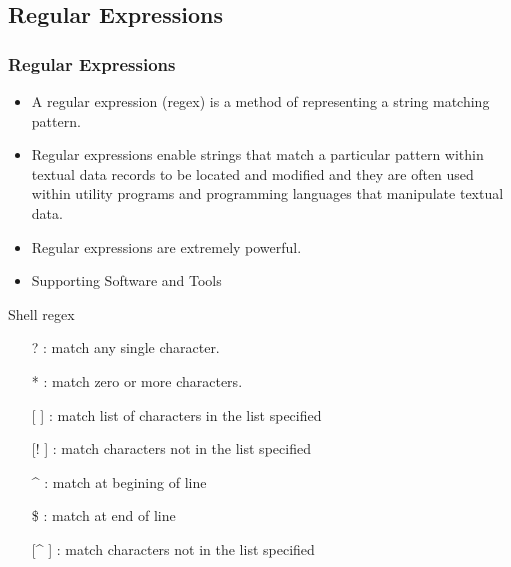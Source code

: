 \documentclass[slidestop,mathserif,compress,xcolor=svgnames]{beamer}
\newenvironment{eblock}[0]
{
\begin{beamerboxesrounded}[upper=uppercol2,lower=lowercol2,shadow=true]}
{\end{beamerboxesrounded}}
\begin{document}
\subsection{Regular Expressions}
\begin{frame}[allowframebreaks]
  \frametitle{\small Regular Expressions}
  \begin{itemize}
    \item A regular expression (regex) is a method of representing a string matching pattern. 
    \item Regular expressions enable strings that match a particular pattern within textual data records to be located and modified and they are often used within utility programs and programming languages that manipulate textual data. 
    \item Regular expressions are extremely powerful.
    \item Supporting Software and Tools
    \begin{enumerate}
      \fontsize{7}{10}\selectfont{
        \item Command Line Tools: grep, egrep, sed
        \item Editors: ed, vi, emacs
        \item Languages: awk, perl, python, php, ruby, tcl, java, javascript, .NET
      }
    \end{enumerate}
  \end{itemize}
  \begin{eblock}{Shell regex}
    \begin{itemize}
      \item[?]: match any single character.
      \item[*]: match zero or more characters.
      \item[{[ ]}]: match list of characters in the list specified
      \item[{[! ]}]: match characters not in the list specified
      \item[\^{}]: match at begining of line
      \item[\$]: match at end of line
      \item[{[\^{} ]}]: match characters not in the list specified
    \end{itemize}
  \end{eblock}
\end{frame}
\end{document}
